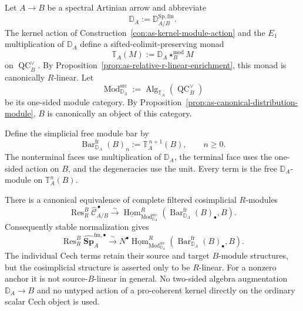 \begin{theorem}
\label{thm:as-cellwise-operator-action}
Let $A\to B$ be a spectral Artinian arrow and abbreviate
\[
    \mathbb D_A
    :=
    \mathbb D_{A/B}^{\mathrm{Sp,fin}}.
\]
The kernel action of
Construction~\ref{con:as-kernel-module-action} and the $E_1$ multiplication
of $\mathbb D_A$ define a sifted-colimit-preserving monad
\[
\boxed{
    \mathbb T_A(M)
    :=
    \mathbb D_A\star_B^{\mathrm{mod}}M
}
\]
on $\operatorname{QC}^{\vee}_B$.  By
Proposition~\ref{prop:as-relative-r-linear-enrichment}, this monad is
canonically $R$-linear.  Let
\[
    \operatorname{Mod}^{\mathrm{src}}_{\mathbb D_A}
    :=
    \operatorname{Alg}_{\mathbb T_A}
    (\operatorname{QC}^{\vee}_B)
\]
be its one-sided module category.  By
Proposition~\ref{prop:as-canonical-distribution-module}, $B$ is canonically
an object of this category.

Define the simplicial free module bar by
\[
\boxed{
    \operatorname{Bar}^{\mathrm{fr}}_{\mathbb D_A}(B)_n
    :=
    \mathbb T_A^{\,n+1}(B),
    \qquad n\geq0.
}
\]
The nonterminal faces use multiplication of $\mathbb D_A$, the terminal face
uses the one-sided action on $B$, and the degeneracies use the unit.  Every
term is the free $\mathbb D_A$-module on $\mathbb T_A^n(B)$.

There is a canonical equivalence of complete filtered cosimplicial
$R$-modules
\[
\boxed{
    \operatorname{Res}_R^B
    \widehat{\mathscr C}^{\,\bullet}_{A/B}
    \xrightarrow{\sim}
    \underline{\operatorname{Hom}}^R_{
        \operatorname{Mod}^{\mathrm{src}}_{\mathbb D_A}}
    \left(
        \operatorname{Bar}^{\mathrm{fr}}_{\mathbb D_A}(B)_\bullet,
        B
    \right).
}
\]
Consequently stable normalization gives
\[
\boxed{
    \operatorname{Res}_R^B
    \widehat{\mathbf{Sp}}_{A}^{\mathrm{fm},\bullet}
    \xrightarrow{\sim}
    N^\bullet
    \underline{\operatorname{Hom}}^R_{
        \operatorname{Mod}^{\mathrm{src}}_{\mathbb D_A}}
    \left(
        \operatorname{Bar}^{\mathrm{fr}}_{\mathbb D_A}(B)_\bullet,
        B
    \right).
}
\]
The individual Cech terms retain their source and target $B$-module
structures, but the cosimplicial structure is asserted only to be
$R$-linear.  For a nonzero anchor it is not source-$B$-linear in general.
No two-sided algebra augmentation $\mathbb D_A\to B$ and no untyped action of
a pro-coherent kernel directly on the ordinary scalar Cech object is used.
\end{theorem}

